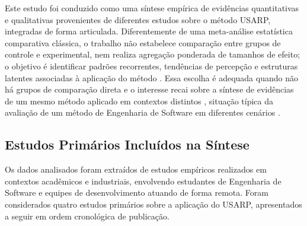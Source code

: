 Este estudo foi conduzido como uma síntese empírica de evidências quantitativas e qualitativas provenientes de diferentes estudos sobre o método USARP, integradas de forma articulada. Diferentemente de uma meta-análise estatística comparativa clássica, o trabalho não estabelece comparação entre grupos de controle e experimental, nem realiza agregação ponderada de tamanhos de efeito; o objetivo é identificar padrões recorrentes, tendências de percepção e estruturas latentes associadas à aplicação do método \cite{kitchenham2009,rodrigues2010}. Essa escolha é adequada quando não há grupos de comparação direta e o interesse recai sobre a síntese de evidências de um mesmo método aplicado em contextos distintos \cite{rodrigues2010,cruzesdyba2010}, situação típica da avaliação de um método de Engenharia de Software em diferentes cenários \cite{runeson2012}.

\subsection{Estudos Primários Incluídos na Síntese}
\label{sec:estudos-primarios}

Os dados analisados foram extraídos de estudos empíricos realizados em contextos acadêmicos e industriais, envolvendo estudantes de Engenharia de Software e equipes de desenvolvimento atuando de forma remota. Foram considerados quatro estudos primários sobre a aplicação do USARP, apresentados a seguir em ordem cronológica de publicação.

